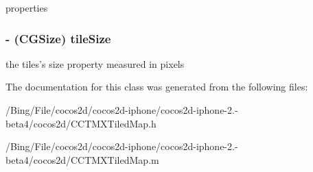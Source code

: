 properties \hypertarget{interface_c_c_t_m_x_tiled_map_abc2a131730260e673fbe8ff51fde6490}{
\subsubsection[{tile\-Size}]{\setlength{\rightskip}{0pt plus 5cm}-\/ (C\-G\-Size) {\bf tile\-Size}}}\label{interface_c_c_t_m_x_tiled_map_abc2a131730260e673fbe8ff51fde6490}
the tiles's size property measured in pixels 

The documentation for this class was generated from the following files\-:\begin{DoxyCompactItemize}
\item 
/\-Bing/\-File/cocos2d/cocos2d-\/iphone/cocos2d-\/iphone-\/2.-\/beta4/cocos2d/C\-C\-T\-M\-X\-Tiled\-Map.\-h\item 
/\-Bing/\-File/cocos2d/cocos2d-\/iphone/cocos2d-\/iphone-\/2.-\/beta4/cocos2d/C\-C\-T\-M\-X\-Tiled\-Map.\-m\end{DoxyCompactItemize}
